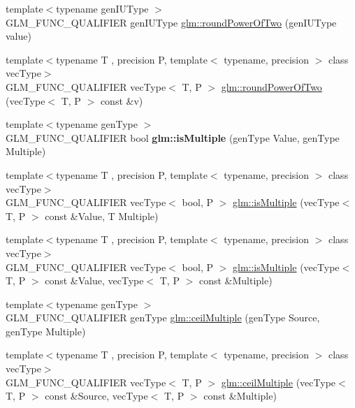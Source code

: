 \begin{DoxyCompactItemize}
\item 
{\footnotesize template$<$typename gen\+I\+U\+Type $>$ }\\G\+L\+M\+\_\+\+F\+U\+N\+C\+\_\+\+Q\+U\+A\+L\+I\+F\+I\+ER gen\+I\+U\+Type \hyperlink{group__gtc__round_ga6d24a9e3abe3e6a908661b43acb8efe0}{glm\+::round\+Power\+Of\+Two} (gen\+I\+U\+Type value)
\item 
{\footnotesize template$<$typename T , precision P, template$<$ typename, precision $>$ class vec\+Type$>$ }\\G\+L\+M\+\_\+\+F\+U\+N\+C\+\_\+\+Q\+U\+A\+L\+I\+F\+I\+ER vec\+Type$<$ T, P $>$ \hyperlink{group__gtc__round_gae95be3b384f3bbd00c6c1cf0a1f96485}{glm\+::round\+Power\+Of\+Two} (vec\+Type$<$ T, P $>$ const \&v)
\item 
\mbox{\label{round_8inl_a1749b696a2f7a956da67d67a557ae134}} 
{\footnotesize template$<$typename gen\+Type $>$ }\\G\+L\+M\+\_\+\+F\+U\+N\+C\+\_\+\+Q\+U\+A\+L\+I\+F\+I\+ER bool {\bfseries glm\+::is\+Multiple} (gen\+Type Value, gen\+Type Multiple)
\item 
{\footnotesize template$<$typename T , precision P, template$<$ typename, precision $>$ class vec\+Type$>$ }\\G\+L\+M\+\_\+\+F\+U\+N\+C\+\_\+\+Q\+U\+A\+L\+I\+F\+I\+ER vec\+Type$<$ bool, P $>$ \hyperlink{group__gtc__round_ga50ea5d5dc33fffba39ad6002a3784123}{glm\+::is\+Multiple} (vec\+Type$<$ T, P $>$ const \&Value, T Multiple)
\item 
{\footnotesize template$<$typename T , precision P, template$<$ typename, precision $>$ class vec\+Type$>$ }\\G\+L\+M\+\_\+\+F\+U\+N\+C\+\_\+\+Q\+U\+A\+L\+I\+F\+I\+ER vec\+Type$<$ bool, P $>$ \hyperlink{group__gtc__round_ga7ae705574ef3e3ebfb4f537d8d285c48}{glm\+::is\+Multiple} (vec\+Type$<$ T, P $>$ const \&Value, vec\+Type$<$ T, P $>$ const \&Multiple)
\item 
{\footnotesize template$<$typename gen\+Type $>$ }\\G\+L\+M\+\_\+\+F\+U\+N\+C\+\_\+\+Q\+U\+A\+L\+I\+F\+I\+ER gen\+Type \hyperlink{group__gtc__round_gac84898c466e609cdd2e81d9ba907d9e8}{glm\+::ceil\+Multiple} (gen\+Type Source, gen\+Type Multiple)
\item 
{\footnotesize template$<$typename T , precision P, template$<$ typename, precision $>$ class vec\+Type$>$ }\\G\+L\+M\+\_\+\+F\+U\+N\+C\+\_\+\+Q\+U\+A\+L\+I\+F\+I\+ER vec\+Type$<$ T, P $>$ \hyperlink{group__gtc__round_gafe632af669ac57d670ca18e3665a12ca}{glm\+::ceil\+Multiple} (vec\+Type$<$ T, P $>$ const \&Source, vec\+Type$<$ T, P $>$ const \&Multiple)

\end{DoxyCompactItemize}
